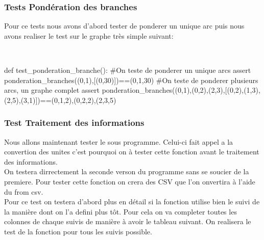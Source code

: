 \documentclass{article}
\begin{document}
\subsubsection{Tests Pondération des branches}
Pour ce tests nous avons d'abord tester de ponderer un unique arc puis nous avons realiser le test sur le graphe très simple suivant:

\\
\begin{center}
\end{center}


\begin{python}
def test_ponderation_branche():
    #On teste de ponderer un unique arcs
    assert ponderation_branches({(0,1)},[(0,30)])=={(0,1,30)}
    #On teste de ponderer plusieurs arcs, un graphe complet
    assert ponderation_branches({(0,1),(0,2),(2,3)},[(0,2),(1,3),(2,5),(3,1)])=={(0,1,2),(0,2,2),(2,3,5)}
\end{python}

\subsubsection{Test Traitement des informations}
Nous allons maintenant tester le sous programme. Celui-ci fait appel a la convertion des unites c'est pourquoi on à tester cette fonction avant le traitement des informations.
\\
On testera dirrectement la seconde verson du programme sans se soucier de la premiere. Pour tester cette fonction on crera des CSV que l'on onvertira à l'aide du from csv.
\\
Pour ce test on testera d'abord plus en détail si la fonction utilise bien le suivi de la manière dont on l'a defini plus tôt. Pour cela on va completer toutes les colonnes de chaque suivis de manière à avoir le tableau suivant. On realisera le test de la fonction pour tous les suivis possible.
\end{document}
